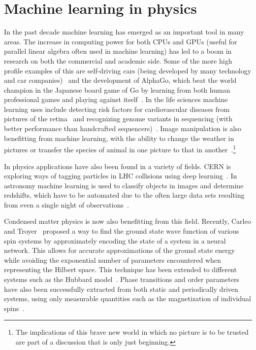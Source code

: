 \documentclass[11pt, a4paper]{report} %
\begin{document}
\section{Machine learning in physics}

In the past decade machine learning has emerged as an important tool in many areas.
The increase in computing power for both CPUs and GPUs (useful for parallel linear algebra often used in machine learning) has led to a boom in research on both the commercial and academic side.
Some of the more high profile examples of this are self-driving cars (being developed by many technology and car companies)~\cite{levinson11_towar} and the development of AlphaGo, which beat the world champion in the Japanese board game of Go by learning from both human professional games and playing against itself~\cite{Silver2017a,Silver2017,silver16_master_game_go_with_deep}.
In the life sciences machine learning uses include detecting risk factors for cardiovascular diseases from pictures of the retina~\cite{poplin17_predic_cardiov_risk_factor_from} and recognizing genome variants in sequencing (with better performance than handcrafted sequencers)~\cite{Poplin2016}.
Image manipulation is also benefitting from machine learning, with the ability to change the weather in pictures or transfer the species of animal in one picture to that in another~\cite{Liu2017}.\footnote{The implications of this brave new world in which no picture is to be trusted are part of a discussion that is only just beginning.}

In physics applications have also been found in a variety of fields.
CERN is exploring ways of tagging particles in LHC collisions using deep learning~\cite{paganini17_machin_learn_algor_jet_taggin}.
In astronomy machine learning is used to classify objects in images and determine redshifts, which have to be automated due to the often large data sets resulting from even a single night of observations~\cite{ball10_data_minin_and_machin_learn_in_astron}.

Condensed matter physics is now also benefitting from this field.
Recently, Carleo and Troyer~\cite{Carleo2017} proposed a way to find the ground state wave function of various spin systems by approximately encoding the state of a system in a neural network. This allows for accurate approximations of the ground state energy while avoiding the exponential number of parameters encountered when representing the Hilbert space.
This technique has been extended to different systems such as the Hubbard model~\cite{Saito2017}.
Phase transitions and order parameters have also been successfully extracted from both static and periodically driven systems, using only measurable quantities such as the magnetization of individual spins~\cite{Nieuwenburg2017}.
\end{document}
